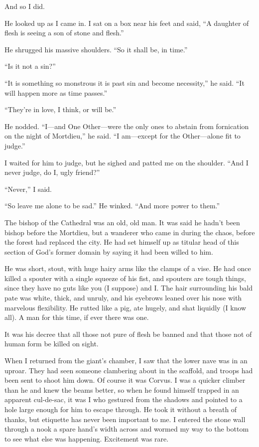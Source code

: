 And so I did.

He looked up as I came in. I sat on a box near his feet and said, ``A daughter of flesh is seeing a son of stone and flesh.''

He shrugged his massive shoulders. ``So it shall be, in time.''

``Is it not a sin?''

``It is something so monstrous it is past sin and become necessity,'' he said. ``It will happen more as time passes.''

``They're in love, I think, or will be.''

He nodded. ``I—and One Other—were the only ones to abstain from fornication on the night of Mortdieu,'' he said. ``I am—except for the Other—alone fit to judge.''

I waited for him to judge, but he sighed and patted me on the shoulder. ``And I never judge, do I, ugly friend?''

``Never,'' I said.

``So leave me alone to be sad.'' He winked. ``And more power to them.''

The bishop of the Cathedral was an old, old man. It was said he hadn't been bishop before the Mortdieu, but a wanderer who came in during the chaos, before the forest had replaced the city. He had set himself up as titular head of this section of God's former domain by saying it had been willed to him.

He was short, stout, with huge hairy arms like the clamps of a vise. He had once killed a spouter with a single squeeze of his fist, and spouters are tough things, since they have no guts like you (I suppose) and I. The hair surrounding his bald pate was white, thick, and unruly, and his eyebrows leaned over his nose with marvelous flexibility. He rutted like a pig, ate hugely, and shat liquidly (I know all). A man for this time, if ever there was one.

It was his decree that all those not pure of flesh be banned and that those not of human form be killed on sight.

When I returned from the giant's chamber, I saw that the lower nave was in an uproar. They had seen someone clambering about in the scaffold, and troops had been sent to shoot him down. Of course it was Corvus. I was a quicker climber than he and knew the beams better, so when he found himself trapped in an apparent cul-de-sac, it was I who gestured from the shadows and pointed to a hole large enough for him to escape through. He took it without a breath of thanks, but etiquette has never been important to me. I entered the stone wall through a nook a spare hand's width across and wormed my way to the bottom to see what else was happening. Excitement was rare.

